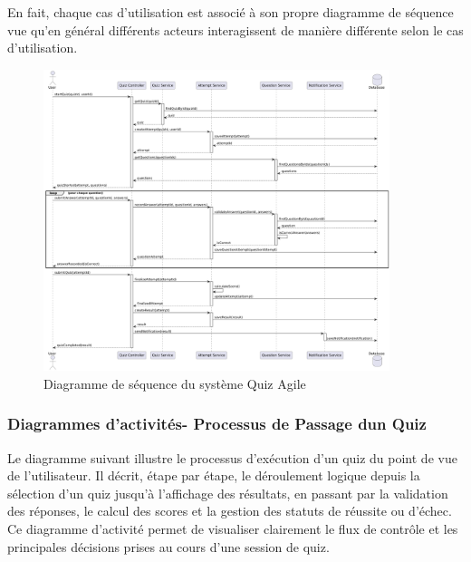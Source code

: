 \documentclass[12pt,a4paper,twoside]{report}
\begin{document}
En fait, chaque cas d'utilisation est associé à son propre diagramme de
séquence vue qu'en général différents acteurs interagissent de manière
différente selon le cas d'utilisation.

\begin{figure}[H]
\centering
\includegraphics[width=0.9\textwidth]{latex_media/media/image19.png}
\caption{Diagramme de séquence du système Quiz Agile}
\label{fig:diagramme-sequence}
\end{figure}

\hypertarget{diagrammes-dactivituxe9s--processus-de-passage-dun-quiz}{%
\subsubsection{Diagrammes d'activités- Processus de Passage
d\textquotesingle un
Quiz}\label{diagrammes-dactivituxe9s--processus-de-passage-dun-quiz}}

Le diagramme suivant illustre le processus d'exécution d'un quiz du
point de vue de l'utilisateur. Il décrit, étape par étape, le
déroulement logique depuis la sélection d'un quiz jusqu'à l'affichage
des résultats, en passant par la validation des réponses, le calcul des
scores et la gestion des statuts de réussite ou d'échec. Ce diagramme
d'activité permet de visualiser clairement le flux de contrôle et les
principales décisions prises au cours d'une session de quiz.
\end{document}
